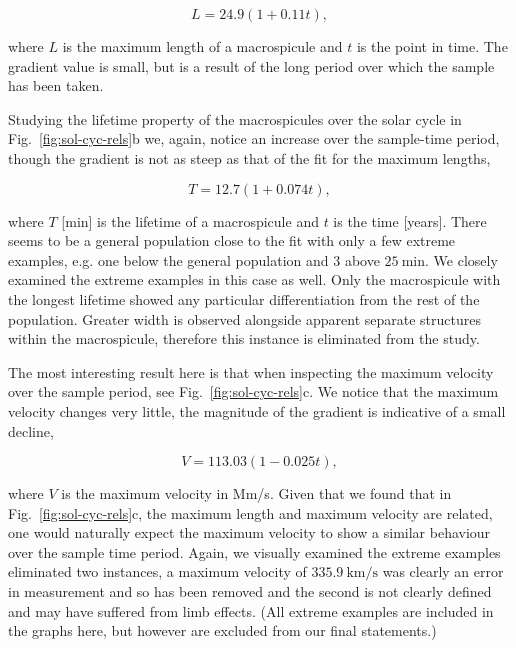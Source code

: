 \begin{equation}
L = 24.9(1 + 0.11t),
\end{equation}

\noindent where $L$ is the maximum length of a macrospicule and $t$ is the point in time. The gradient value is small, but is a result of the long period over which the sample has been taken.

Studying the lifetime property of the macrospicules over the solar cycle in Fig.~\ref{fig:sol-cyc-rels}b we, again, notice an increase over the sample-time period, though the gradient is not as steep as that of the fit for the maximum lengths, 

\begin{equation}
T = 12.7(1 + 0.074t),
\end{equation}

\noindent where $T$ [min] is the lifetime of a macrospicule and $t$ is the time [years]. There seems to be a general population close to the fit with only a few extreme examples, e.g. one below the general population and 3 above $25\ \textrm{min}$. We closely examined the extreme examples in this case as well. Only the macrospicule with the longest lifetime showed any particular differentiation from the rest of the population. Greater width is observed alongside apparent separate structures within the macrospicule, therefore this instance is eliminated from the study.

The most interesting result here is that when inspecting the maximum velocity over the sample period, see Fig.~\ref{fig:sol-cyc-rels}c. We notice that the maximum velocity changes very little, the magnitude of the gradient is indicative of a small decline, 

\begin{equation}
V = 113.03(1 - 0.025t),
\end{equation}

\noindent where $V$ is the maximum velocity in Mm/s. Given that we found that in Fig.~\ref{fig:sol-cyc-rels}c, the maximum length and maximum velocity are related, one would naturally expect the maximum velocity to show a similar behaviour over the sample time period. Again, we visually examined the extreme examples eliminated two instances, a maximum velocity of $335.9\ \textrm{km/s}$ was clearly an error in measurement and so has been removed and the second is not clearly defined and may have suffered from limb effects. (All extreme examples are included in the graphs here, but however are excluded from our final statements.)

